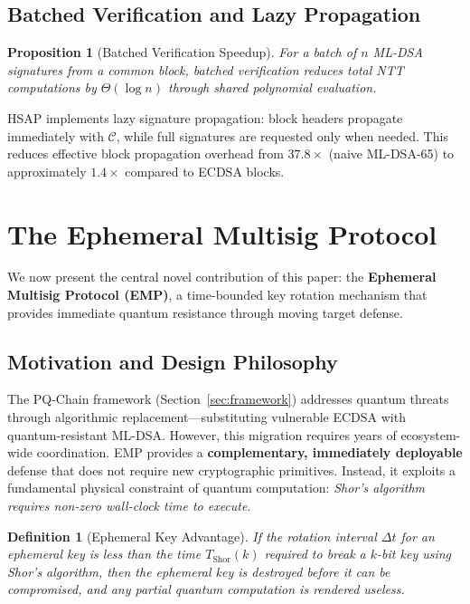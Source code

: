 \documentclass[12pt, a4paper, twocolumn]{article}
\newtheorem{definition}{Definition}
\newtheorem{proposition}{Proposition}
\begin{document}
\subsection{Batched Verification and Lazy Propagation}

\begin{proposition}[Batched Verification Speedup]
For a batch of $n$ ML-DSA signatures from a common block, batched verification reduces total NTT computations by $\Theta(\log n)$ through shared polynomial evaluation.
\end{proposition}

HSAP implements lazy signature propagation: block headers propagate immediately with $\mathcal{C}$, while full signatures are requested only when needed. This reduces effective block propagation overhead from $37.8\times$ (naive ML-DSA-65) to approximately $1.4\times$ compared to ECDSA blocks.

\section{The Ephemeral Multisig Protocol}
\label{sec:emp}

We now present the central novel contribution of this paper: the \textbf{Ephemeral Multisig Protocol (EMP)}, a time-bounded key rotation mechanism that provides immediate quantum resistance through moving target defense.

\subsection{Motivation and Design Philosophy}

The PQ-Chain framework (Section~\ref{sec:framework}) addresses quantum threats through algorithmic replacement---substituting vulnerable ECDSA with quantum-resistant ML-DSA. However, this migration requires years of ecosystem-wide coordination. EMP provides a \textbf{complementary, immediately deployable} defense that does not require new cryptographic primitives. Instead, it exploits a fundamental physical constraint of quantum computation: \emph{Shor's algorithm requires non-zero wall-clock time to execute}.

\begin{definition}[Ephemeral Key Advantage]
If the rotation interval $\Delta t$ for an ephemeral key is less than the time $T_{\text{Shor}}(k)$ required to break a $k$-bit key using Shor's algorithm, then the ephemeral key is destroyed before it can be compromised, and any partial quantum computation is rendered useless.
\end{definition}
\end{document}
